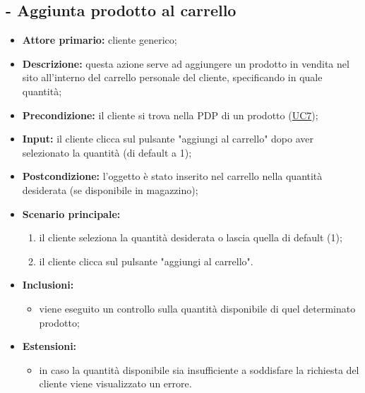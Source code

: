 \subsection{ - Aggiunta prodotto al carrello}
\begin{itemize}
    \item \textbf{Attore primario:} cliente generico;
    \item \textbf{Descrizione:} questa azione serve ad aggiungere un prodotto in vendita nel sito
          all'interno del carrello personale del cliente, specificando in quale quantità;
    \item \textbf{Precondizione:} il cliente si trova nella PDP di un prodotto (\hyperref[UC7]{UC7});
    \item \textbf{Input:} il cliente clicca sul pulsante "aggiungi al carrello" dopo aver selezionato la quantità (di default a 1);
    \item \textbf{Postcondizione:} l'oggetto è stato inserito nel carrello nella quantità desiderata (se disponibile in magazzino);
    \item \textbf{Scenario principale:}
          \begin{enumerate}
              \item il cliente seleziona la quantità desiderata o lascia quella di default (1);
              \item il cliente clicca sul pulsante "aggiungi al carrello".
          \end{enumerate}
    \item \textbf{Inclusioni:}
          \begin{itemize}
              \item viene eseguito un controllo sulla quantità disponibile di quel determinato prodotto;
          \end{itemize}
    \item \textbf{Estensioni:}
          \begin{itemize}
              \item in caso la quantità disponibile sia insufficiente a soddisfare la richiesta del cliente viene visualizzato un errore.
          \end{itemize}
\end{itemize}

\stepUserCase
